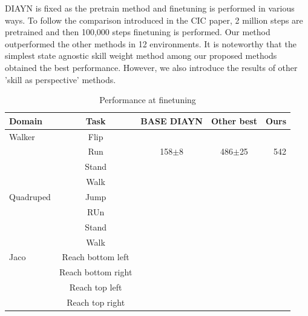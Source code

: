 DIAYN is fixed as the pretrain method and finetuning is performed in various ways.
To follow the comparison introduced in the CIC paper, 2 million steps are pretrained and then 100,000 steps finetuning is performed.
Our method outperformed the other methods in 12 environments.
It is noteworthy that the simplest state agnostic skill weight method among our proposed methods obtained the best performance.
However, we also introduce the results of other 'skill as perspective' methods.
\begin{table}[t]
  \caption{Performance at finetuning}
  \label{finetuning result}
  \vskip 0.15in
  \begin{center}
  \begin{small}
  \begin{sc}
  \begin{tabular}{lcccr}
  \toprule
  Domain & Task & BASE DIAYN & Other best & Ours \\
  \midrule
  Walker & Flip    &  \\
   & Run    & 158$\pm$8 & 486$\pm$25 & 542\\
   & Stand    &  \\
   & Walk    &  \\
  Quadruped & Jump    &  \\
   & RUn    &  \\
   & Stand    &  \\
   & Walk   &  \\
  Jaco & Reach bottom left    &  \\
   & Reach bottom right   &  \\
   & Reach top left    & \\
   & Reach top right   &  \\
  
  
  
  
  \bottomrule
  \end{tabular}
  \end{sc}
  \end{small}
  \end{center}
  \vskip -0.1in
  \end{table}


